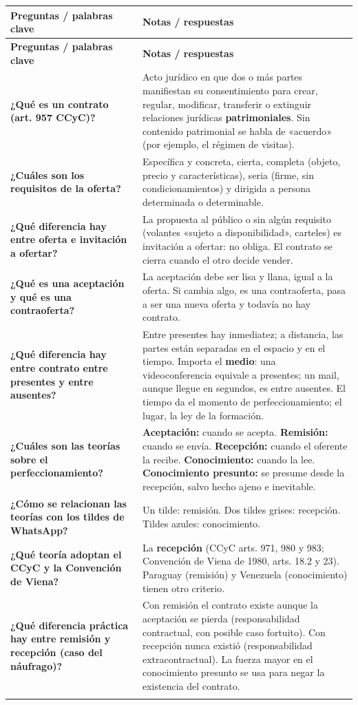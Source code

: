 \documentclass[12pt,oneside]{book}
\makeatletter
\newcommand{\cornellstart}{%
\begin{longtable}{@{}>{\raggedright\arraybackslash}p{0.26\textwidth}%
                  >{\raggedright\arraybackslash}p{\dimexpr0.74\textwidth-2\tabcolsep\relax}@{}}
\toprule
\textbf{Preguntas / palabras clave} & \textbf{Notas / respuestas} \\
\midrule
\endfirsthead
\toprule
\textbf{Preguntas / palabras clave} & \textbf{Notas / respuestas} \\
\midrule
\endhead
}
\newcommand{\cq}[2]{\textbf{#1} & #2 \\[0.6em]}
\newcommand{\cornellend}[1]{%
\midrule
\multicolumn{2}{@{}p{\textwidth}@{}}{\textbf{Resumen:} #1} \\
\bottomrule
\end{longtable}
}
\makeatother
\begin{document}
\cornellstart
\cq{¿Qué es un contrato (art. 957 CCyC)?}{Acto jurídico en que dos o más partes manifiestan su consentimiento para crear, regular, modificar, transferir o extinguir relaciones jurídicas \textbf{patrimoniales}. Sin contenido patrimonial se habla de «acuerdo» (por ejemplo, el régimen de visitas).}
\cq{¿Cuáles son los requisitos de la oferta?}{Específica y concreta, cierta, completa (objeto, precio y características), seria (firme, sin condicionamientos) y dirigida a persona determinada o determinable.}
\cq{¿Qué diferencia hay entre oferta e invitación a ofertar?}{La propuesta al público o sin algún requisito (volantes «sujeto a disponibilidad», carteles) es invitación a ofertar: no obliga. El contrato se cierra cuando el otro decide vender.}
\cq{¿Qué es una aceptación y qué es una contraoferta?}{La aceptación debe ser lisa y llana, igual a la oferta. Si cambia algo, es una contraoferta, pasa a ser una nueva oferta y todavía no hay contrato.}
\cq{¿Qué diferencia hay entre contrato entre presentes y entre ausentes?}{Entre presentes hay inmediatez; a distancia, las partes están separadas en el espacio y en el tiempo. Importa el \textbf{medio}: una videoconferencia equivale a presentes; un mail, aunque llegue en segundos, es entre ausentes. El tiempo da el momento de perfeccionamiento; el lugar, la ley de la formación.}
\cq{¿Cuáles son las teorías sobre el perfeccionamiento?}{\textbf{Aceptación:} cuando se acepta. \textbf{Remisión:} cuando se envía. \textbf{Recepción:} cuando el oferente la recibe. \textbf{Conocimiento:} cuando la lee. \textbf{Conocimiento presunto:} se presume desde la recepción, salvo hecho ajeno e inevitable.}
\cq{¿Cómo se relacionan las teorías con los tildes de WhatsApp?}{Un tilde: remisión. Dos tildes grises: recepción. Tildes azules: conocimiento.}
\cq{¿Qué teoría adoptan el CCyC y la Convención de Viena?}{La \textbf{recepción} (CCyC arts. 971, 980 y 983; Convención de Viena de 1980, arts. 18.2 y 23). Paraguay (remisión) y Venezuela (conocimiento) tienen otro criterio.}
\cq{¿Qué diferencia práctica hay entre remisión y recepción (caso del náufrago)?}{Con remisión el contrato existe aunque la aceptación se pierda (responsabilidad contractual, con posible caso fortuito). Con recepción nunca existió (responsabilidad extracontractual). La fuerza mayor en el conocimiento presunto se usa para negar la existencia del contrato.}
\cornellend{El primer paso al analizar un contrato es determinar si existe: debe haber oferta (con sus cinco requisitos) y aceptación lisa y llana. En los contratos entre ausentes, el momento y el lugar del perfeccionamiento dependen de la teoría adoptada (aceptación, remisión, recepción, conocimiento o conocimiento presunto); Argentina, mediante el CCyC y la Convención de Viena, adopta la recepción.}
\end{document}
